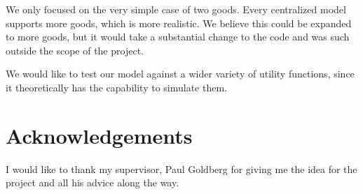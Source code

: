 \documentclass[12pt,a4paper,titlepage]{article}
\begin{document}
We only focused on the very simple case of two goods.
Every centralized model supports more goods, which is more realistic.
We believe this could be expanded to more goods, but it would take a substantial change to the code and was such outside the scope of the project.

We would like to test our model against a wider variety of utility functions, since it theoretically has the capability to simulate them.


\section{Acknowledgements}\label{acknowledgements}
I would like to thank my supervisor, Paul Goldberg for giving me the idea for the project and all his advice along the way.


\printbibliography
\end{document}
